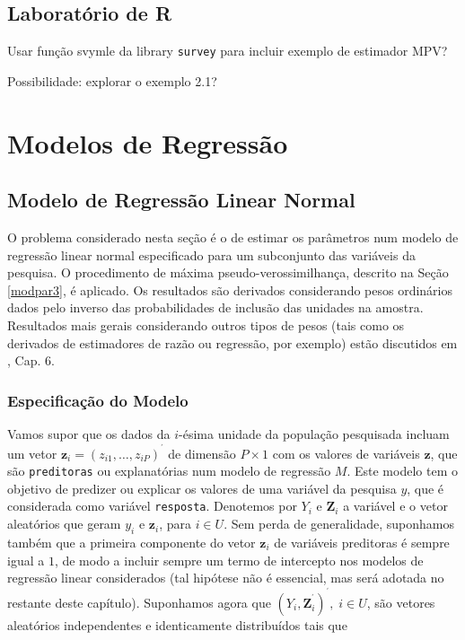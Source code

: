 \documentclass[]{book}
\numberwithin{example}{chapter}
\numberwithin{remark}{chapter}
\numberwithin{definition}{chapter}
\begin{document}
\section{Laboratório de R}\label{laboratorio-de-r-2}

Usar função svymle da library \texttt{survey} \citep{R-survey} para
incluir exemplo de estimador MPV?

Possibilidade: explorar o exemplo 2.1?

\chapter{Modelos de Regressão}\label{modreg}

\section{Modelo de Regressão Linear Normal}\label{modlinear}

O problema considerado nesta seção é o de estimar os parâmetros num
modelo de regressão linear normal especificado para um subconjunto das
variáveis da pesquisa. O procedimento de máxima pseudo-verossimilhança,
descrito na Seção \ref{modpar3}, é aplicado. Os resultados são derivados
considerando pesos ordinários dados pelo inverso das probabilidades de
inclusão das unidades na amostra. Resultados mais gerais considerando
outros tipos de pesos (tais como os derivados de estimadores de razão ou
regressão, por exemplo) estão discutidos em \citep{Silva}, Cap. 6.

\subsection{Especificação do Modelo}\label{especificacao-do-modelo}

Vamos supor que os dados da \(i\)-ésima unidade da população pesquisada
incluam um vetor
\(\mathbf{z}_{i}=\left( z_{i1},\ldots ,z_{iP}\right) ^{^{\prime }}\) de
dimensão \(P\times 1\) com os valores de variáveis \(\mathbf{z}\), que
são \texttt{preditoras} ou explanatórias num modelo de regressão \(M\).
Este modelo tem o objetivo de predizer ou explicar os valores de uma
variável da pesquisa \(y\), que é considerada como variável
\texttt{resposta}. Denotemos por \(Y_{i}\) e \(\mathbf{Z}_{i}\) a
variável e o vetor aleatórios que geram \(y_{i}\) e \(\mathbf{z}_{i}\),
para \(i\in U\). Sem perda de generalidade, suponhamos também que a
primeira componente do vetor \(\mathbf{z}_{i}\) de variáveis preditoras
é sempre igual a \(1\), de modo a incluir sempre um termo de intercepto
nos modelos de regressão linear considerados (tal hipótese não é
essencial, mas será adotada no restante deste capítulo). Suponhamos
agora que
\(\left( Y_{i},\mathbf{Z}_{i}^{^{\prime }}\right) ^{^{\prime }},\;i\in U\),
são vetores aleatórios independentes e identicamente distribuídos tais
que
\end{document}

